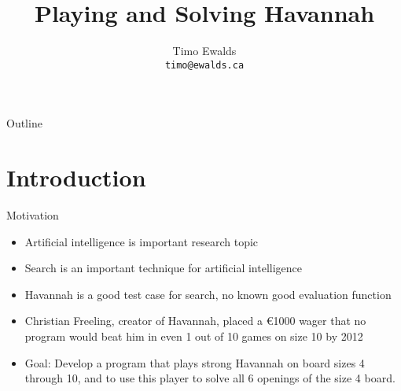 \documentclass{beamer} %
\title{Playing and Solving Havannah}
\author[Timo Ewalds]{
	Timo Ewalds \\
	\texttt{timo@ewalds.ca}
}
\institute[UofA]{
	Department of Computing Science\\
	University of Alberta
}
\begin{document}
\begin{frame}[plain]
	\titlepage
\end{frame}


\AtBeginSection[]{
\begin{frame}{Outline}
\tableofcontents[currentsection]%
\end{frame}
}

\AtBeginSubsection[]{
\begin{frame}{Outline}
\tableofcontents[currentsection, currentsubsection]%
\end{frame}
}

\begin{frame}{Outline}
\tableofcontents%
\end{frame}


\section{Introduction}

\begin{frame}{Motivation}
\begin{itemize}
	\item Artificial intelligence is important research topic
	\item Search is an important technique for artificial intelligence
	\item Havannah is a good test case for search, no known good evaluation function
	\item Christian Freeling, creator of Havannah, placed a \euro 1000 wager that no program would beat him in even 1 out of 10 games on size 10 by 2012
	\item Goal: Develop a program that plays strong Havannah on board sizes 4 through 10, and to use this player to solve all 6 openings of the size 4 board.
\end{itemize}
\end{frame}
\end{document}
